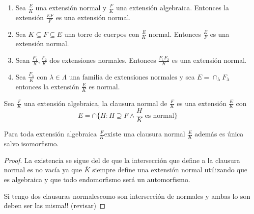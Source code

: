 \begin{proposition}
\begin{enumerate}
\item Sea $\frac{E}{K}$ una extensión normal y $\frac{F}{K}$ una extensión algebraica. Entonces la extensión $\frac{EF}{F}$ es una extensión normal. 
\item Sea $K \subseteq F \subseteq E$ una torre de cuerpos con $\frac{E}{K}$ normal. Entonces $\frac{E}{F}$ es una extensión normal. 
\item Sean $\frac{F_1}{K},\frac{F_2}{K}$ dos extensiones normales. Entonces $\frac{F_1F_2}{K}$ es una extensión normal. 
\item Sea $\frac{F_\lambda}{K}$ con $\lambda \in \Lambda$ una familia de extensiones normales y sea $E = \cap_\lambda F_\lambda$ entonces la extensión $\frac{E}{K}$ es normal. 
\end{enumerate}
\end{proposition}

\begin{definition}
Sea $\frac{F}{K}$ una extensión algebraica, la clausura normal de $\frac{F}{K}$ es una extensión $\frac{E}{K}$ con $$E = \cap \{H:H \supseteq F \land \frac{H}{K} \text{ es normal}\}$$
\end{definition}

\begin{proposition}
Para toda extensión algebraica $\frac{F}{K}$existe una clausura normal $\frac{E}{K}$ además es única salvo isomorfismo. 
\end{proposition}
\begin{proof}
La existencia se sigue del de que la intersección que define a la clausura normal es no vacía ya que $\overline{K}$ siempre define una extensión normal utilizando que es algebraica y que todo endomorfismo será un automorfismo.

Si tengo dos clausuras normalescomo son intersección de normales y ambas lo son deben ser las misma!! (revisar)
\end{proof}

